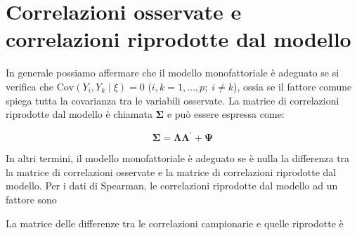 \documentclass[
  11pt,
]{krantz}
\makeatletter
\newenvironment{Shaded}{\begin{snugshade}}{\end{snugshade}}
\newcommand{\CommentTok}[1]{\textcolor[rgb]{0.37,0.37,0.37}{\textit{#1}}}
\newcommand{\DecValTok}[1]{\textcolor[rgb]{0.06,0.06,0.06}{#1}}
\newcommand{\FunctionTok}[1]{\textcolor[rgb]{0,0,0}{#1}}
\newcommand{\NormalTok}[1]{#1}
\newcommand{\SpecialCharTok}[1]{\textcolor[rgb]{0,0,0}{#1}}
\newenvironment{kframe}{%
\medskip{}
\setlength{\fboxsep}{.8em}
 \def\at@end@of@kframe{}%
 \ifinner\ifhmode%
  \def\at@end@of@kframe{\end{minipage}}%
  \begin{minipage}{\columnwidth}%
 \fi\fi%
 \def\FrameCommand##1{\hskip\@totalleftmargin \hskip-\fboxsep
 \colorbox{shadecolor}{##1}\hskip-\fboxsep
     \hskip-\linewidth \hskip-\@totalleftmargin \hskip\columnwidth}%
 \MakeFramed {\advance\hsize-\width
   \@totalleftmargin\z@ \linewidth\hsize
   \@setminipage}}%
 {\par\unskip\endMakeFramed%
 \at@end@of@kframe}
\renewenvironment{Shaded}{\begin{kframe}}{\end{kframe}}
\theoremstyle{definition}
\theoremstyle{definition}
\theoremstyle{definition}
\theoremstyle{definition}
\theoremstyle{remark}
\makeatother
\begin{document}
\hypertarget{correlazioni-osservate-e-correlazioni-riprodotte-dal-modello}{%
\section{Correlazioni osservate e correlazioni riprodotte dal modello}\label{correlazioni-osservate-e-correlazioni-riprodotte-dal-modello}}

In generale possiamo affermare che il modello monofattoriale è adeguato se si verifica che \(\mbox{Cov}(Y_i, Y_k \mid \xi) = 0\) (\(i, k = 1, \dots,p; \; i\neq k\)), ossia se il fattore comune spiega tutta la covarianza tra le variabili osservate. La matrice di correlazioni riprodotte dal modello è chiamata \(\boldsymbol{\Sigma}\) e può essere espressa come:

\[
\boldsymbol{\Sigma} = \boldsymbol{\Lambda} \boldsymbol{\Lambda}^\prime + \boldsymbol{\Psi}
\]

In altri termini, il modello monofattoriale è adeguato se è nulla la differenza tra la matrice di correlazioni osservate e la matrice di correlazioni riprodotte dal modello. Per i dati di Spearman, le correlazioni riprodotte dal modello ad un fattore sono

\begin{Shaded}
\end{Shaded}

La matrice delle differenze tra le correlazioni campionarie e quelle riprodotte è

\begin{Shaded}
\end{Shaded}
\end{document}
